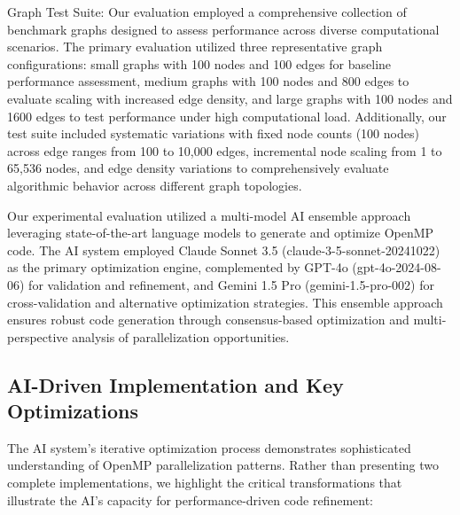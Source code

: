 Graph Test Suite: Our evaluation employed a comprehensive collection of benchmark graphs designed to assess performance across diverse computational scenarios. The primary evaluation utilized three representative graph configurations: small graphs with 100 nodes and 100 edges for baseline performance assessment, medium graphs with 100 nodes and 800 edges to evaluate scaling with increased edge density, and large graphs with 100 nodes and 1600 edges to test performance under high computational load. Additionally, our test suite included systematic variations with fixed node counts (100 nodes) across edge ranges from 100 to 10,000 edges, incremental node scaling from 1 to 65,536 nodes, and edge density variations to comprehensively evaluate algorithmic behavior across different graph topologies. 

Our experimental evaluation utilized a multi-model AI ensemble approach leveraging state-of-the-art language models to generate and optimize OpenMP code. The AI system employed Claude Sonnet 3.5 (claude-3-5-sonnet-20241022) as the primary optimization engine, complemented by GPT-4o (gpt-4o-2024-08-06) for validation and refinement, and Gemini 1.5 Pro (gemini-1.5-pro-002) for cross-validation and alternative optimization strategies. This ensemble approach ensures robust code generation through consensus-based optimization and multi-perspective analysis of parallelization opportunities.



\subsection{AI-Driven Implementation and Key Optimizations}

The AI system's iterative optimization process demonstrates sophisticated understanding of OpenMP parallelization patterns. Rather than presenting two complete implementations, we highlight the critical transformations that illustrate the AI's capacity for performance-driven code refinement:


